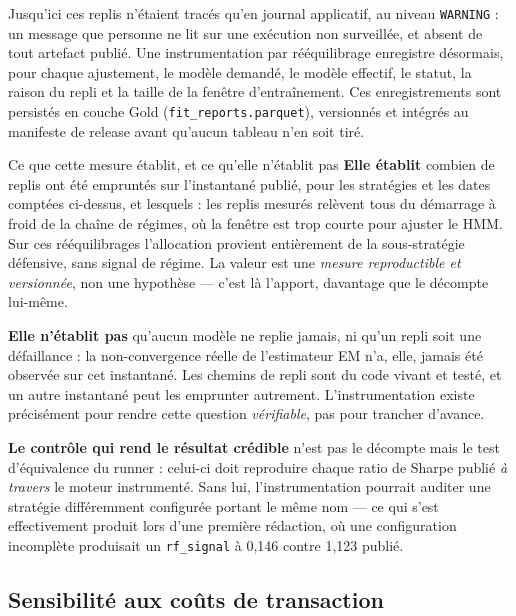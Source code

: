 Jusqu'ici ces replis n'étaient tracés qu'en journal applicatif, au niveau
\texttt{WARNING} : un message que personne ne lit sur une exécution non
surveillée, et absent de tout artefact publié. Une instrumentation par
rééquilibrage enregistre désormais, pour chaque ajustement, le modèle demandé,
le modèle effectif, le statut, la raison du repli et la taille de la fenêtre
d'entraînement. Ces enregistrements sont persistés en couche Gold
(\texttt{fit\_reports.parquet}), versionnés et intégrés au manifeste de release
avant qu'aucun tableau n'en soit tiré.



\integriteVerdict{}

\begin{resultatbox}{Ce que cette mesure établit, et ce qu'elle n'établit pas}
\textbf{Elle établit} combien de replis ont été empruntés sur l'instantané
publié, pour les stratégies et les dates comptées ci-dessus, et lesquels : les
\integriteReplis{} replis mesurés relèvent tous du démarrage à froid de la
chaîne de régimes, où la fenêtre est trop courte pour ajuster le HMM. Sur ces
rééquilibrages l'allocation provient entièrement de la sous-stratégie
défensive, sans signal de régime. La valeur est une \emph{mesure reproductible
et versionnée}, non une hypothèse — c'est là l'apport, davantage que le
décompte lui-même.

\textbf{Elle n'établit pas} qu'aucun modèle ne replie jamais, ni qu'un repli
soit une défaillance : la non-convergence réelle de l'estimateur EM n'a, elle,
jamais été observée sur cet instantané. Les chemins de repli sont du code
vivant et testé, et un autre instantané peut les emprunter autrement.
L'instrumentation existe précisément pour rendre cette question
\emph{vérifiable}, pas pour trancher d'avance.

\textbf{Le contrôle qui rend le résultat crédible} n'est pas le décompte mais le
test d'équivalence du runner : celui-ci doit reproduire chaque ratio de Sharpe
publié \emph{à travers} le moteur instrumenté. Sans lui, l'instrumentation
pourrait auditer une stratégie différemment configurée portant le même nom —
ce qui s'est effectivement produit lors d'une première rédaction, où une
configuration incomplète produisait un \texttt{rf\_signal} à 0,146 contre 1,123
publié.
\end{resultatbox}

\subsection{Sensibilité aux coûts de transaction}

